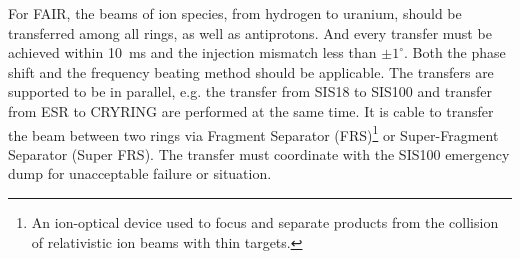 For FAIR, the beams of ion species, from hydrogen to uranium, should be transferred among all rings, as well as antiprotons. And every transfer must be achieved within \SI{10}{ms} and the injection mismatch less than $\pm1^\circ$. Both the phase shift and the frequency beating method should be applicable. The transfers are supported to be in parallel, e.g. the transfer from SIS18 to SIS100 and transfer from ESR to CRYRING are performed at the same time. It is cable to transfer the beam between two rings via Fragment Separator (\gls{FRS})\footnote{An ion-optical device used to focus and separate products from the collision of relativistic ion beams with thin targets.} or Super-Fragment Separator (Super FRS). The transfer must coordinate with the SIS100 emergency dump for unacceptable failure or situation. 


%
